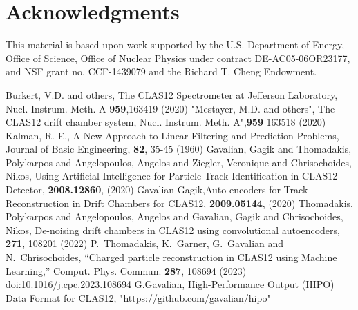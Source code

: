 \documentclass{webofc}
\begin{document}
\section{Acknowledgments}
This material is based upon work supported by the U.S. Department of Energy, Office of Science, Office of Nuclear Physics under contract DE-AC05-06OR23177, and NSF grant no. CCF-1439079 and the Richard T. Cheng Endowment. 
 
 
 \begin{thebibliography}{}
Burkert, V.D. and others, The CLAS12 Spectrometer at Jefferson Laboratory, Nucl. Instrum. Meth. A \textbf{959},163419 (2020)
 "Mestayer, M.D. and others", The CLAS12 drift chamber system, Nucl. Instrum. Meth. A",\textbf{959} 163518 (2020)
  Kalman, R. E., A New Approach to Linear Filtering and Prediction Problems, Journal of Basic Engineering, \textbf{82}, 35-45 (1960)
Gavalian, Gagik and Thomadakis, Polykarpos and Angelopoulos, Angelos and Ziegler, Veronique and Chrisochoides, Nikos, Using Artificial Intelligence for Particle Track Identification in CLAS12 Detector, \textbf{2008.12860}, (2020)
 Gavalian Gagik,Auto-encoders for Track Reconstruction in Drift Chambers for CLAS12, \textbf{2009.05144}, (2020)
   Thomadakis, Polykarpos and Angelopoulos, Angelos and Gavalian, Gagik and Chrisochoides, Nikos, De-noising drift chambers in CLAS12 using convolutional autoencoders, \textbf{271}, 108201 (2022)   
P.~Thomadakis, K.~Garner, G.~Gavalian and N.~Chrisochoides,
``Charged particle reconstruction in CLAS12 using Machine Learning,''
Comput. Phys. Commun. \textbf{287}, 108694 (2023) doi:10.1016/j.cpc.2023.108694
  G.Gavalian, High-Performance Output (HIPO) Data Format for CLAS12,  "https://github.com/gavalian/hipo"
\end{thebibliography}
 
\end{document}
